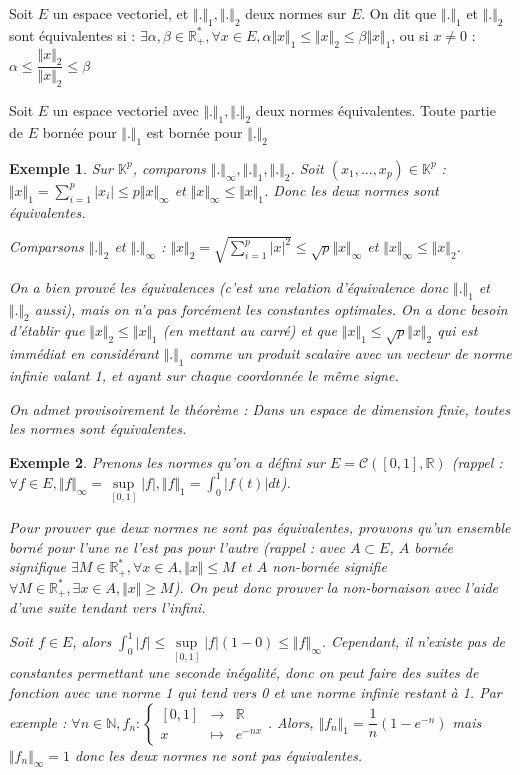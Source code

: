 \documentclass[a4paper,12pt]{book}
\newcommand{\Def}[2]{\begin{tcolorbox}[sharp corners, colback=white,colframe=blue!90!black!75, title=Définition : #1]#2\end{tcolorbox}}
\newcommand{\Prop}[2]{\begin{tcolorbox}[sharp corners, colback=white,colframe=red!90!black!75, title=Proposition : #1]#2\end{tcolorbox}}
\newtheorem{Exe}{Exemple}[section]
\def\R{\mathbb{R}}
\def\N{\mathbb{N}}
\def\K{\mathbb{K}}
\begin{document}
\Def{Normes équivalentes}{Soit $E$ un espace vectoriel, et $\Vert.\Vert_1, \Vert.\Vert_2$ deux normes sur $E$. On dit que $\Vert.\Vert_1$ et $\Vert.\Vert_2$ sont équivalentes si : $\exists \alpha,\beta\in\R_+^*,\forall x\in E, \alpha\Vert x\Vert_1\leq \Vert x\Vert_2\leq \beta\Vert x\Vert_1$, ou si $x\neq0$ : $\alpha\leq\dfrac{\Vert x\Vert_2}{\Vert x\Vert_2}\leq\beta$}
\Prop{Bornes pour normes équivalentes}{Soit $E$ un espace vectoriel avec $\Vert.\Vert_1, \Vert.\Vert_2$ deux normes équivalentes. Toute partie de $E$ bornée pour $\Vert.\Vert_1$ est bornée pour $\Vert.\Vert_2$}
\begin{Exe}
Sur $\K^p$, comparons $\Vert.\Vert_\infty, \Vert.\Vert_1,\Vert.\Vert_2$. Soit $(x_1,..., x_p)\in\K^p$ : $\Vert x\Vert_1=\sum\limits_{i=1}^p\vert x_i\vert\leq p\Vert x\Vert_\infty$ et $\Vert x\Vert_\infty \leq \Vert x\Vert_1$. Donc les deux normes sont équivalentes.
\par Comparsons $\Vert.\Vert_2$ et $\Vert.\Vert_\infty$ : $\Vert x\Vert_2 =\sqrt{\sum\limits_{i=1}^p\vert x\vert^2}\leq \sqrt{p}\Vert x\Vert_\infty$ et $\Vert x\Vert_\infty\leq \Vert x\Vert_2$.
\par On a bien prouvé les équivalences (c'est une relation d'équivalence donc $\Vert.\Vert_1$ et $\Vert.\Vert_2$ aussi), mais on n'a pas forcément les constantes optimales. On a donc besoin d'établir que $\Vert x\Vert_2\leq\Vert x\Vert_1$ (en mettant au carré) et que $\Vert x\Vert_1\leq \sqrt{p} \Vert x\Vert_2$ qui est immédiat en considérant $\Vert.\Vert_1$ comme un produit scalaire avec un vecteur de norme infinie valant 1, et ayant sur chaque coordonnée le même signe.
\par On admet provisoirement le théorème : Dans un espace de dimension finie, toutes les normes sont équivalentes.
\end{Exe}
\begin{Exe}
Prenons les normes qu'on a défini sur $E =\mathcal{C}([0,1],\R)$ (rappel : $\forall f\in E, \Vert f\Vert_\infty = \sup\limits_{[0,1]}\vert f\vert, \Vert f\Vert_1 = \int_0^1\vert f(t)\vert dt$).
\par Pour prouver que deux normes ne sont pas équivalentes, prouvons qu'un ensemble borné pour l'une ne l'est pas pour l'autre (rappel : avec $A\subset E$, $A$ bornée signifique $\exists M\in\R_+^*, \forall x\in A, \Vert x\Vert\leq M$ et $A$ non-bornée signifie $\forall M\in\R_+^*,\exists x\in A, \Vert x\Vert\geq M$). On peut donc prouver la non-bornaison avec l'aide d'une suite tendant vers l'infini.
\par Soit $f\in E$, alors $\int_0^1\vert f\vert \leq\sup\limits_{[0,1]}\vert f\vert (1-0)\leq \Vert f\Vert_\infty$. Cependant, il n'existe pas de constantes permettant une seconde inégalité, donc on peut faire des suites de fonction avec une norme 1 qui tend vers 0 et une norme infinie restant à 1. Par exemple : $\forall n\in\N, f_n:\left\{\begin{array}{rcl} [0,1] & \to & \R \\ x & \mapsto & e^{-nx} \end{array}\right.$. Alors, $\Vert f_n\Vert_1 = \dfrac{1}{n}(1-e^{-n})$ mais $\Vert f_n\Vert_\infty = 1$ donc les deux normes ne sont pas équivalentes.
\end{Exe}
\end{document}
